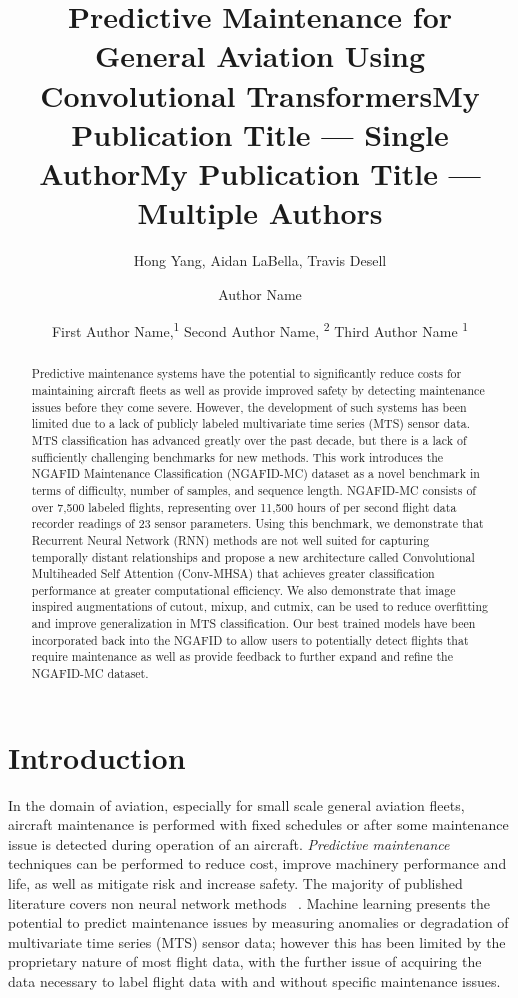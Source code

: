 \documentclass[letterpaper]{article} %
\title{Predictive Maintenance for General Aviation Using Convolutional Transformers}
\author{
    Hong Yang, 
    Aidan LaBella,
    Travis Desell
}
\title{My Publication Title --- Single Author}
\author {
    Author Name
}
\title{My Publication Title --- Multiple Authors}
\author {
    First Author Name,\textsuperscript{\rm 1}
    Second Author Name, \textsuperscript{\rm 2}
    Third Author Name \textsuperscript{\rm 1}
}
\begin{document}
\maketitle

\begin{abstract}
Predictive maintenance systems have the potential to significantly reduce costs for maintaining aircraft fleets as well as provide improved safety by detecting maintenance issues before they come severe. However, the development of such systems has been limited due to a lack of publicly labeled multivariate time series (MTS) sensor data. MTS classification has advanced greatly over the past decade, but there is a lack of sufficiently challenging benchmarks for new methods. This work introduces the NGAFID Maintenance Classification (NGAFID-MC) dataset as a novel benchmark in terms of difficulty, number of samples, and sequence length. NGAFID-MC consists of over 7,500 labeled flights, representing over 11,500 hours of per second flight data recorder readings of 23 sensor parameters. Using this benchmark, we demonstrate that Recurrent Neural Network (RNN) methods are not well suited for capturing temporally distant relationships and propose a new architecture called Convolutional Multiheaded Self Attention (Conv-MHSA) that achieves greater classification performance at greater computational efficiency. We also demonstrate that image inspired augmentations of cutout, mixup, and cutmix, can be used to reduce overfitting and improve generalization in MTS classification.  Our best trained models have been incorporated back into the NGAFID to allow users to potentially detect flights that require maintenance as well as provide feedback to further expand and refine the NGAFID-MC dataset.
\end{abstract}



\section{Introduction}

In the domain of aviation, especially for small scale general aviation fleets, aircraft maintenance is performed with fixed schedules or after some maintenance issue is detected during operation of an aircraft. \emph{Predictive maintenance} techniques can be performed to reduce cost, improve machinery performance and life, as well as mitigate risk and increase safety. The majority of published literature covers non neural network methods ~\cite{PredModel-CARVALHO2019106024}.  Machine learning presents the potential to predict maintenance issues by measuring anomalies or degradation of multivariate time series (MTS) sensor data; however this has been limited by the proprietary nature of most flight data, with the further issue of acquiring the data necessary to label flight data with and without specific maintenance issues.
\end{document}
